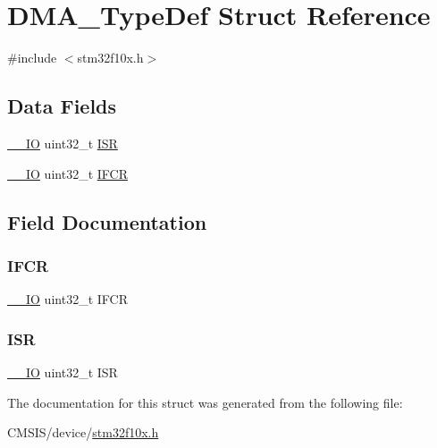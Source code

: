 \hypertarget{struct_d_m_a___type_def}{}\section{D\+M\+A\+\_\+\+Type\+Def Struct Reference}
\label{struct_d_m_a___type_def}


{\ttfamily \#include $<$stm32f10x.\+h$>$}

\subsection*{Data Fields}
\begin{DoxyCompactItemize}
\item 
\mbox{\hyperlink{core__sc300_8h_aec43007d9998a0a0e01faede4133d6be}{\+\_\+\+\_\+\+IO}} uint32\+\_\+t \mbox{\hyperlink{struct_d_m_a___type_def_ab3c49a96815fcbee63d95e1e74f20e75}{I\+SR}}
\item 
\mbox{\hyperlink{core__sc300_8h_aec43007d9998a0a0e01faede4133d6be}{\+\_\+\+\_\+\+IO}} uint32\+\_\+t \mbox{\hyperlink{struct_d_m_a___type_def_ac6f9d540fd6a21c0fbc7bfbbee9a8504}{I\+F\+CR}}
\end{DoxyCompactItemize}


\subsection{Field Documentation}
\mbox{\label{struct_d_m_a___type_def_ac6f9d540fd6a21c0fbc7bfbbee9a8504}} 
\subsubsection{\texorpdfstring{IFCR}{IFCR}}
{\footnotesize\ttfamily \mbox{\hyperlink{core__sc300_8h_aec43007d9998a0a0e01faede4133d6be}{\+\_\+\+\_\+\+IO}} uint32\+\_\+t I\+F\+CR}

\mbox{\label{struct_d_m_a___type_def_ab3c49a96815fcbee63d95e1e74f20e75}} 
\subsubsection{\texorpdfstring{ISR}{ISR}}
{\footnotesize\ttfamily \mbox{\hyperlink{core__sc300_8h_aec43007d9998a0a0e01faede4133d6be}{\+\_\+\+\_\+\+IO}} uint32\+\_\+t I\+SR}



The documentation for this struct was generated from the following file\+:\begin{DoxyCompactItemize}
\item 
C\+M\+S\+I\+S/device/\mbox{\hyperlink{stm32f10x_8h}{stm32f10x.\+h}}\end{DoxyCompactItemize}
